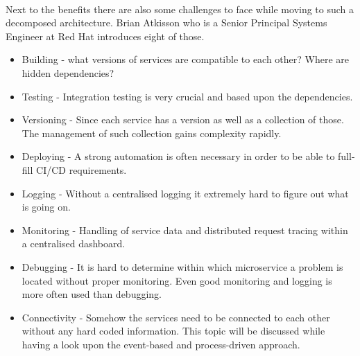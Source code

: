\\
Next to the benefits there are also some challenges to face while moving to such a decomposed architecture. Brian Atkisson who is a Senior Principal Systems Engineer at Red Hat introduces eight of those. 
\begin{itemize}
    \item Building - what versions of services are compatible to each other? Where are hidden dependencies?
    \item Testing - Integration testing is very crucial and based upon the dependencies. 
    \item Versioning - Since each service has a version as well as a collection of those. The management of such collection gains complexity rapidly.
    \item Deploying - A strong automation is often necessary in order to be able to full-fill CI/CD requirements.
    \item Logging - Without a centralised logging it extremely hard to figure out what is going on.
    \item Monitoring - Handling of service data and distributed request tracing within a centralised dashboard.
    \item Debugging - It is hard to determine within which microservice  a problem is located without proper monitoring. Even good monitoring and logging is more often used than debugging.
    \item Connectivity - Somehow the services need to be connected to each other without any hard coded information. This topic will be discussed while having a look upon the event-based and process-driven approach. 
\end{itemize}
\cite{ChallengesMicroservices}

